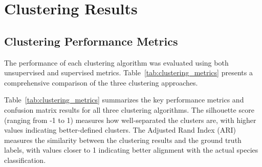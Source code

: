 \documentclass[a4paper,12pt]{report}
\begin{document}
\section{Clustering Results}

\subsection{Clustering Performance Metrics}

The performance of each clustering algorithm was evaluated using both unsupervised and supervised metrics. Table~\ref{tab:clustering_metrics} presents a comprehensive comparison of the three clustering approaches.

\begin{table}[H]
    \centering
    \caption{Performance and confusion matrix summary for clustering algorithms. TP = True Positives, FN = False Negatives, GWG = Glaucous-Winged Gull, SBG = Slaty-Backed Gull.}
    \label{tab:clustering_metrics}
\end{table}

Table~\ref{tab:clustering_metrics} summarizes the key performance metrics and confusion matrix results for all three clustering algorithms. The silhouette score (ranging from -1 to 1) measures how well-separated the clusters are, with higher values indicating better-defined clusters. The Adjusted Rand Index (ARI) measures the similarity between the clustering results and the ground truth labels, with values closer to 1 indicating better alignment with the actual species classification.

\end{document}
